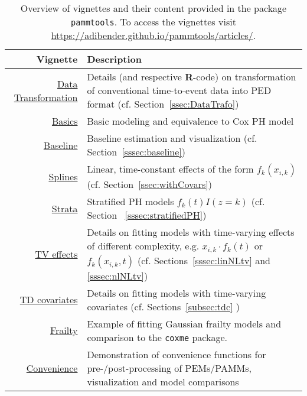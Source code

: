 \documentclass[submit]{smj}
\newcommand{\Rlang}{\textbf{\textsf{R}}}
\newcommand{\code}[1]{{\small \texttt{#1}}}
\begin{document}
\begin{table}[!hbtp]
\caption{Overview of vignettes and their content provided in the package
\code{pammtools}. To access the vignettes visit
\url{https://adibender.github.io/pammtools/articles/}.}
\label{tab:vignettes}
\vspace{15pt}
\begin{tabular}{r|p{12cm}}
  Vignette &Description \\
  \hline
  \href{https://adibender.github.io/pammtools/articles/data-transformation.html}
  {Data Transformation} & Details (and respective \Rlang-code) on transformation
  of conventional time-to-event data into PED format (cf. Section~\ref{ssec:DataTrafo})\\
  \href{https://adibender.github.io/pammtools/articles/basics.html}{Basics} &
  Basic modeling and equivalence to Cox PH model\\
  \href{https://adibender.github.io/pammtools/articles/baseline.html}{Baseline}
  & Baseline estimation and visualization (cf. Section~\ref{sssec:baseline})\\
  \href{https://adibender.github.io/pammtools/articles/splines.html}{Splines}
  & Linear, time-constant effects of the form $f_k(x_{i,k})$
  (cf. Section~\ref{ssec:withCovars})\\
  \href{https://adibender.github.io/pammtools/articles/strata.html}{Strata}    &
  Stratified PH models  $f_k(t)I(z=k)$ (cf. Section~
  \ref{sssec:stratifiedPH})\\
 \href{https://adibender.github.io/pammtools/articles/tveffects.html}{TV
 effects}
 & Details on fitting models with time-varying effects
  of different complexity, e.g. $x_{i,k}\cdot f_k(t)$ or $f_k(x_{i,k}, t)$
  (cf. Sections~\ref{sssec:linNLtv} and \ref{sssec:nlNLtv})\\
  \href{https://adibender.github.io/pammtools/articles/tdcovar.html}{TD
  covariates}
  & Details on fitting models with time-varying covariates
  (cf. Sections~\ref{subsec:tdc} )\\
  \href{https://adibender.github.io/pammtools/articles/frailty.html}{Frailty} &
  Example of fitting Gaussian frailty models and comparison
  to the \code{coxme} package. \\
  \href{https://adibender.github.io/pammtools/articles/convenience.html}{Convenience}
  & Demonstration of convenience functions for
  pre-/post-processing of PEMs/PAMMs, visualization and model comparisons
\end{tabular}
\end{table}
\end{document}
